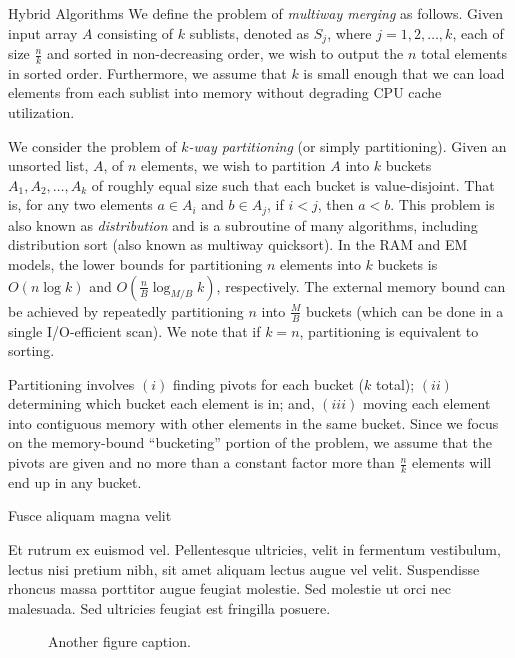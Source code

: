 \documentclass[final]{beamer}
\newlength{\colwidth}
\begin{document}
\begin{frame}[t]
\begin{columns}[t]
\begin{column}{\colwidth}
\begin{block}{Hybrid Algorithms}
   We define the problem of \emph{multiway merging} as follows.  Given input array $A$ consisting of $k$ sublists, denoted as $S_j$, 
   where $j=1, 2,\ldots,k$, each of size  $\frac{n}{k}$ and sorted in non-decreasing order, we wish to output the $n$ total elements 
   in sorted order. Furthermore, we assume that $k$ is small enough that we can load elements 
   from each sublist into memory without degrading CPU cache utilization.


We consider the problem of \emph{$k$-way partitioning} (or simply partitioning).  Given an unsorted list, $A$, of $n$ elements, we wish to partition $A$ into $k$ buckets $A_1, A_2, \ldots, A_k$ of roughly equal size such that each bucket is value-disjoint.  That is, for any two elements $a \in A_i$ and $b \in A_j$, if $i < j$, then $a<b$.  This problem is also known as \emph{distribution} and is a subroutine of many algorithms, including distribution sort (also known as multiway quicksort).  In the RAM and EM models, the lower bounds for partitioning $n$ elements into $k$ buckets is $O(n \log{k})$ and $O(\frac{n}{B}\log_{M/B}{k})$, respectively.  The external memory bound can be achieved by repeatedly partitioning $n$ into $\frac{M}{B}$ buckets (which can be done in a single I/O-efficient scan).  
We note that if $k=n$, partitioning is equivalent to sorting. 

Partitioning involves $(i)$ finding pivots for each bucket ($k$ total); $(ii)$ determining which bucket each element is in; and, $(iii)$ moving each element into contiguous memory with other elements in the same bucket.  Since we focus on the memory-bound ``bucketing'' portion of the problem, we assume that the pivots are given and no more than a constant factor more than $\frac{n}{k}$ elements will end up in any bucket.


  \end{block}

  \begin{block}{Fusce aliquam magna velit}

    Et rutrum ex euismod vel. Pellentesque ultricies, velit in fermentum
    vestibulum, lectus nisi pretium nibh, sit amet aliquam lectus augue vel
    velit. Suspendisse rhoncus massa porttitor augue feugiat molestie. Sed
    molestie ut orci nec malesuada. Sed ultricies feugiat est fringilla
    posuere.

    \begin{figure}
      \centering
      \caption{Another figure caption.}
    \end{figure}


\end{block}
\end{column}
\end{columns}
\end{frame}
\end{document}
